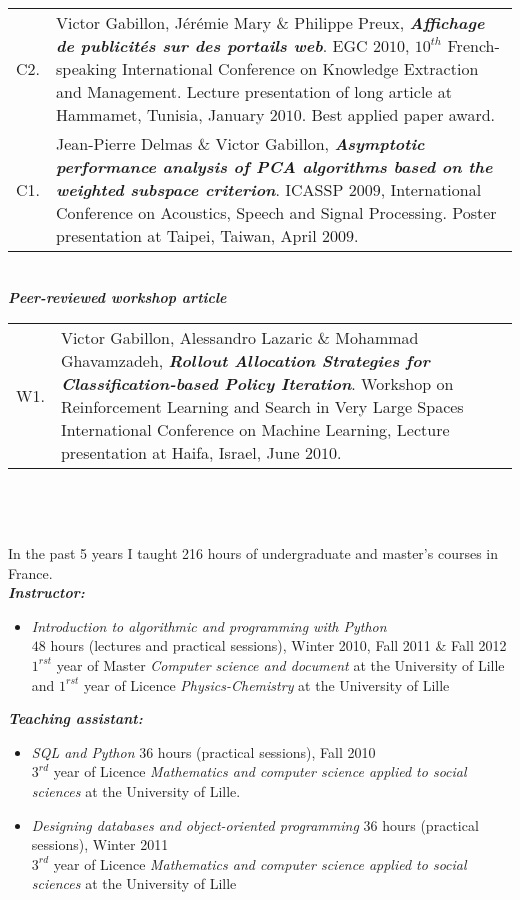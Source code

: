 \begin{tabularx}{\columnwidth}{@{} l X @{}}
C2. & Victor Gabillon, Jérémie Mary $\&$ Philippe Preux, \textbf{ \emph{Affichage de publicités sur des portails web}}. EGC $2010$, $10^{th}$ French-speaking International Conference on Knowledge Extraction and Management. Lecture presentation of long article at Hammamet, Tunisia, January $2010$. Best applied paper award.\\

 
C1. & Jean-Pierre Delmas $\&$ Victor Gabillon,\textbf{ \emph{Asymptotic performance analysis of PCA algorithms based on the weighted subspace criterion}}.  ICASSP $2009$, International Conference on Acoustics, Speech and Signal Processing. Poster presentation at Taipei, Taiwan, April $2009$. 
   \end{tabularx}\\

\newpage
\noindent\textit{\textbf{Peer-reviewed workshop article}}\\
\noindent\begin{tabularx}{\columnwidth}{@{} l X @{}}
 W1. & Victor Gabillon,  Alessandro Lazaric $\&$ Mohammad Ghavamzadeh, \textbf{ \emph{Rollout Allocation Strategies for Classification-based Policy Iteration}}. Workshop on Reinforcement Learning and Search in Very Large Spaces International Conference on Machine Learning,  Lecture presentation at Haifa, Israel, June $2010$.
  \end{tabularx}\\
  
  



\noindent{}\\[-.4cm]\noindent\makebox[\linewidth]{\rule{\columnwidth}{0.4pt}}\\[.1cm]
In the past 5 years I taught 216 hours of undergraduate and master's courses in France.\\
\textit{\textbf{Instructor:}} 
 \begin{itemize} 
 \item\textit{Introduction to algorithmic and programming with Python}\\
    $48$ hours (lectures and practical sessions), Winter 2010, Fall 2011 \& Fall 2012\\
    $1^{rst}$ year of Master \textit{Computer science and document} at the University of Lille  and  $1^{rst}$ year of Licence \textit{Physics-Chemistry} at the University of Lille 
    \end{itemize}
\textit{\textbf{Teaching assistant:}} 
\begin{itemize}
 \item \textit{SQL and Python} $36$ hours (practical sessions), Fall 2010\\
    $3^{rd}$ year of Licence \textit{Mathematics and computer science applied to social sciences} at the University of Lille. 
\item \textit{Designing databases and object-oriented programming}
    $36$ hours (practical sessions), Winter 2011\\
    $3^{rd}$ year of Licence \textit{Mathematics and computer science applied to social sciences} at the University of Lille \end{itemize}

